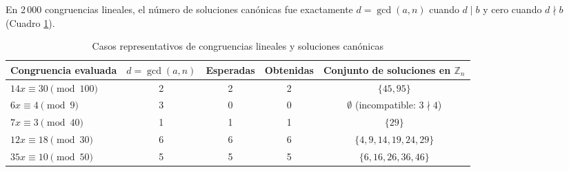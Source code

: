 En 2\,000 congruencias lineales, el número de soluciones canónicas fue exactamente $d = \gcd(a, n)$ cuando $d \mid b$ y cero cuando $d \nmid b$ (Cuadro \ref{tab:congruencias_ejemplos}).

\begin{table}[H]
    \caption{Casos representativos de congruencias lineales y soluciones canónicas}
    \label{tab:congruencias_ejemplos}
    \centering
    \footnotesize
    \begin{tabular*}{\textwidth}{@{\extracolsep{\fill}}lcccc}
        \toprule
        \textbf{Congruencia evaluada} & $d = \gcd(a, n)$ & \textbf{Esperadas} & \textbf{Obtenidas} & \textbf{Conjunto de soluciones en $\mathbb{Z}_n$} \\
        \midrule
        $14x \equiv 30 \pmod{100}$ & 2 & 2 & 2 & $\{45, 95\}$ \\
        $6x \equiv 4 \pmod 9$      & 3 & 0 & 0 & $\emptyset$ (incompatible: $3 \nmid 4$) \\
        $7x \equiv 3 \pmod{40}$    & 1 & 1 & 1 & $\{29\}$ \\
        $12x \equiv 18 \pmod{30}$  & 6 & 6 & 6 & $\{4, 9, 14, 19, 24, 29\}$ \\
        $35x \equiv 10 \pmod{50}$  & 5 & 5 & 5 & $\{6, 16, 26, 36, 46\}$ \\
        \bottomrule
    \end{tabular*}
\end{table}
